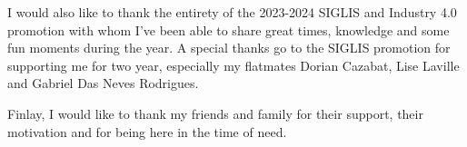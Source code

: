 \documentclass[conference]{IEEEtran}
\begin{document}
I would also like to thank the entirety of the 2023-2024 SIGLIS and Industry 4.0 promotion with whom I've been able to share great times, knowledge and some fun moments during the year. A special thanks go to the SIGLIS promotion for supporting me for two year, especially my flatmates Dorian Cazabat, Lise Laville and Gabriel Das Neves Rodrigues. 

Finlay, I would like to thank my friends and family for their support, their motivation and for being here in the time of need.
\vspace{12pt}



\printglossary
\end{document}
